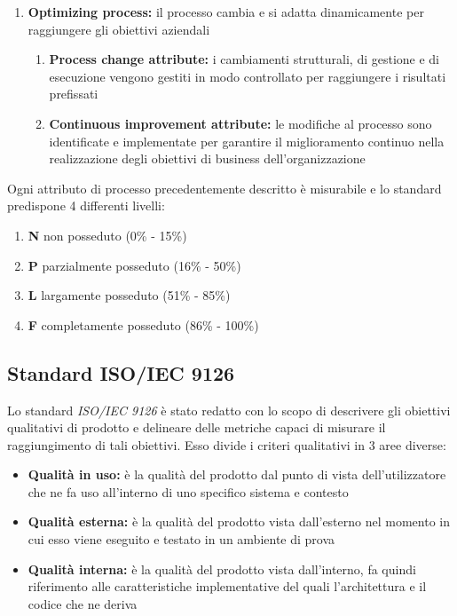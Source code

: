 \documentclass[12pt,a4paper]{article}
\begin{document}
\begin{enumerate}
	\item\textbf{Optimizing process:} il processo cambia e si adatta dinamicamente per raggiungere gli obiettivi aziendali
	\begin{enumerate}
		\item \textbf{Process change attribute:} i cambiamenti strutturali, di gestione e di esecuzione vengono gestiti in modo controllato per raggiungere i risultati prefissati
		\item \textbf{Continuous improvement attribute:} le modifiche al processo sono identificate e implementate per garantire il miglioramento continuo nella realizzazione degli obiettivi di business dell'organizzazione
	\end{enumerate}
\end{enumerate}

Ogni attributo di processo precedentemente descritto è misurabile e lo standard predispone 4 differenti livelli:

\begin{enumerate}
	\item \textbf{N} non posseduto (0\% - 15\%)
	\item \textbf{P} parzialmente posseduto (16\% - 50\%)
	\item \textbf{L} largamente posseduto (51\% - 85\%)
	\item \textbf{F} completamente posseduto (86\% - 100\%)
\end{enumerate}

\subsection{Standard ISO/IEC 9126}
Lo standard \textit{ISO/IEC 9126} è stato redatto con lo scopo di descrivere gli obiettivi qualitativi di prodotto e delineare delle metriche capaci di misurare il raggiungimento di tali obiettivi. Esso divide i criteri qualitativi in 3 aree diverse:

\begin{itemize}
	\item \textbf{Qualità in uso:} è la qualità del prodotto  dal punto di vista dell'utilizzatore che ne fa uso all'interno di uno specifico sistema e contesto
	\item \textbf{Qualità esterna:} è la qualità del prodotto  vista dall'esterno nel momento in cui esso viene eseguito e testato in un ambiente di prova
	\item \textbf{Qualità interna:} è la qualità del prodotto  vista dall'interno, fa quindi riferimento alle caratteristiche implementative del  quali l'architettura e il codice che ne deriva
\end{itemize}
\end{document}
